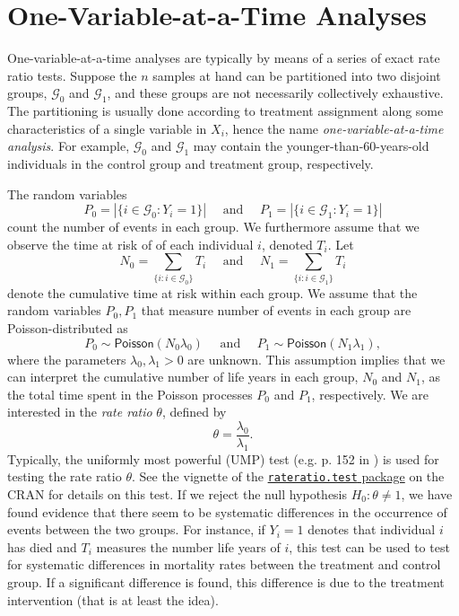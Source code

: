 \documentclass[11pt]{article}
\begin{document}
\section{One-Variable-at-a-Time Analyses}
One-variable-at-a-time analyses are typically by means of a series of exact rate ratio tests. Suppose the $n$ samples at hand can be partitioned into two disjoint groups, $\mathcal{G}_0$ and $\mathcal{G}_1$, and these groups are not necessarily collectively exhaustive. The  partitioning is usually done according to treatment assignment along some characteristics of a single variable in $X_i$, hence the name \textit{one-variable-at-a-time analysis}. For example, $\mathcal{G}_0$ and $\mathcal{G}_1$ may contain the younger-than-60-years-old individuals in the control group and treatment group, respectively. 

The random variables 
\[
    P_0 = |\{i \in \mathcal{G}_0 : Y_i = 1\}|
    \quad \text{ and } \quad
    P_1 = |\{i \in \mathcal{G}_1 : Y_i = 1\}|
\]
count the number of events in each group. We furthermore assume that we observe the time at risk of of each individual $i$, denoted $T_i$. Let
\[
    N_0 = \sum_{\{i:i\in\mathcal{G}_0\}} T_i
    \quad \text{ and } \quad
    N_1 = \sum_{\{i:i\in\mathcal{G}_1\}} T_i
\]
denote the cumulative time at risk within each group. We assume that the random variables $P_0,P_1$ that measure number of events in each group are Poisson-distributed as
\[
    P_0\sim \textsf{Poisson}(N_0 \lambda_0)
    \quad \text{ and } \quad
    P_1\sim \textsf{Poisson}(N_1 \lambda_1),
\]
where the parameters $\lambda_0, \lambda_1 >0$ are unknown. This assumption implies that we can interpret the cumulative number of life years in each group, $N_0$ and $N_1$, as the total time spent in the Poisson processes $P_0$ and $P_1$, respectively. We are interested in the \textit{rate ratio} $\theta$, defined by
\[
    \theta = \frac{\lambda_0}{\lambda_1}.
\]
Typically, the uniformly most powerful (UMP) test (e.g. p. 152 in \citealp{lehmann1986}) is used for testing the rate ratio $\theta$. See the vignette of the \href{https://cran.r-project.org/web/packages/rateratio.test/index.html}{\texttt{rateratio.test} package} on the CRAN for details on this test. If we reject the null hypothesis $H_0: \theta \neq 1$, we have found evidence that there seem to be systematic differences in the occurrence of events between the two groups. For instance, if $Y_i=1$ denotes that individual $i$ has died and $T_i$ measures the number life years of $i$, this test can be used to test for systematic differences in mortality rates between the treatment and control group. If a significant difference is found, this difference is due to the treatment intervention (that is at least the idea).
\end{document}
